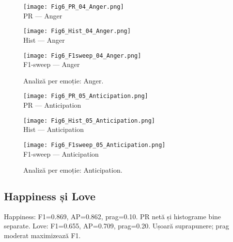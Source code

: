 \begin{figure}[H]
  \centering
  \begin{minipage}[t]{0.32\textwidth}\centering
    \texttt{[image: Fig6\_PR\_04\_Anger.png]}\\[-1mm]
    {\scriptsize PR — Anger}
  \end{minipage}\hfill
  \begin{minipage}[t]{0.32\textwidth}\centering
    \texttt{[image: Fig6\_Hist\_04\_Anger.png]}\\[-1mm]
    {\scriptsize Hist — Anger}
  \end{minipage}\hfill
  \begin{minipage}[t]{0.32\textwidth}\centering
    \texttt{[image: Fig6\_F1sweep\_04\_Anger.png]}\\[-1mm]
    {\scriptsize F1-sweep — Anger}
  \end{minipage}
  \caption{Analiză per emoție: Anger.}
  \label{fig:c6-anger}
\end{figure}

\begin{figure}[H]
  \centering
  \begin{minipage}[t]{0.32\textwidth}\centering
    \texttt{[image: Fig6\_PR\_05\_Anticipation.png]}\\[-1mm]
    {\scriptsize PR — Anticipation}
  \end{minipage}\hfill
  \begin{minipage}[t]{0.32\textwidth}\centering
    \texttt{[image: Fig6\_Hist\_05\_Anticipation.png]}\\[-1mm]
    {\scriptsize Hist — Anticipation}
  \end{minipage}\hfill
  \begin{minipage}[t]{0.32\textwidth}\centering
    \texttt{[image: Fig6\_F1sweep\_05\_Anticipation.png]}\\[-1mm]
    {\scriptsize F1-sweep — Anticipation}
  \end{minipage}
  \caption{Analiză per emoție: Anticipation.}
  \label{fig:c6-anticipation}
\end{figure}

\subsection{Happiness și Love}
\noindent Happiness: F1=0.869, AP=0.862, prag=0.10. PR netă și histograme bine separate.
\noindent Love: F1=0.655, AP=0.709, prag=0.20. Ușoară suprapunere; prag moderat maximizează F1.

